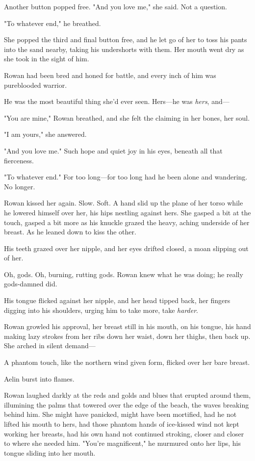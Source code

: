 Another button popped free.
"And you love me," she said.
Not a question.

"To whatever end," he breathed.

She popped the third and final button free, and he let go of her to toss his pants into the sand nearby, taking his undershorts with them.
Her mouth went dry as she took in the sight of him.

Rowan had been bred and honed for battle, and every inch of him was pureblooded warrior.

He was the most beautiful thing she'd ever seen.
Hers---he was \emph{hers}, and---

"You are mine," Rowan breathed, and she felt the claiming in her bones, her soul.

"I am yours," she answered.

"And you love me."
Such hope and quiet joy in his eyes, beneath all that fierceness.

"To whatever end."
For too long---for too long had he been alone and wandering.
No longer.

Rowan kissed her again.
Slow.
Soft.
A hand slid up the plane of her torso while he lowered himself over her, his hips nestling against hers.
She gasped a bit at the touch, gasped a bit more as his knuckle grazed the heavy, aching underside of her breast.
As he leaned down to kiss the other.

His teeth grazed over her nipple, and her eyes drifted closed, a moan slipping out of her.

Oh, gods.
Oh, burning, rutting gods.
Rowan knew what he was doing; he really gods-damned did.

His tongue flicked against her nipple, and her head tipped back, her fingers digging into his shoulders, urging him to take more, take \emph{harder}.

Rowan growled his approval, her breast still in his mouth, on his tongue, his hand making lazy strokes from her ribs down her waist, down her thighs, then back up.
She arched in silent demand---

A phantom touch, like the northern wind given form, flicked over her bare breast.

Aelin burst into flames.

Rowan laughed darkly at the reds and golds and blues that erupted around them, illumining the palms that towered over the edge of the beach, the waves breaking behind him.
She might have panicked, might have been mortified, had he not lifted his mouth to hers, had those phantom hands of ice-kissed wind not kept working her breasts, had his own hand not continued stroking, closer and closer to where she needed him.
"You're magnificent," he murmured onto her lips, his tongue sliding into her mouth.

